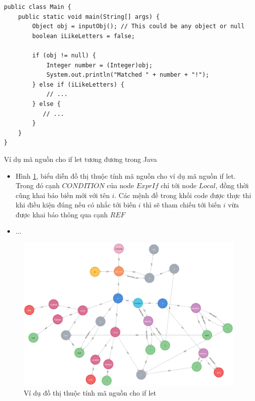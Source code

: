 \begin{listing}[H]
\begin{verbatim}
public class Main {
    public static void main(String[] args) {
        Object obj = inputObj(); // This could be any object or null
        boolean iLikeLetters = false;

        if (obj != null) {
            Integer number = (Integer)obj;
            System.out.println("Matched " + number + "!");
        } else if (iLikeLetters) {
            // ...
        } else {
           // ...
        }
    }
}
\end{verbatim}
\caption{Ví dụ mã nguồn cho if let tương đương trong Java}
\label{code:c3_iflet_java}
\end{listing}

\begin{itemize}
    \item Hình \ref{img:c3_cpg_iflet}, biểu diễn đồ thị thuộc tính mã nguồn cho ví dụ mã nguồn if let. Trong đó cạnh $CONDITION$ của node $ExprIf$ chỉ tới node $Local$, đồng thời cũng khai báo biến mới với tên $i$. Các mệnh đề trong khối code được thực thi khi điều kiện đúng nếu có nhắc tới biến $i$ thì sẽ tham chiếu tới biến $i$ vừa được khai báo thông qua cạnh $REF$
    \item ...
\end{itemize}

\begin{figure}[H]
\includegraphics[width=1\columnwidth]{figures/c2/c2_cpg.png}
\centering
\caption{Ví dụ đồ thị thuộc tính mã nguồn cho if let}
\label{img:c3_cpg_iflet}
\end{figure}


